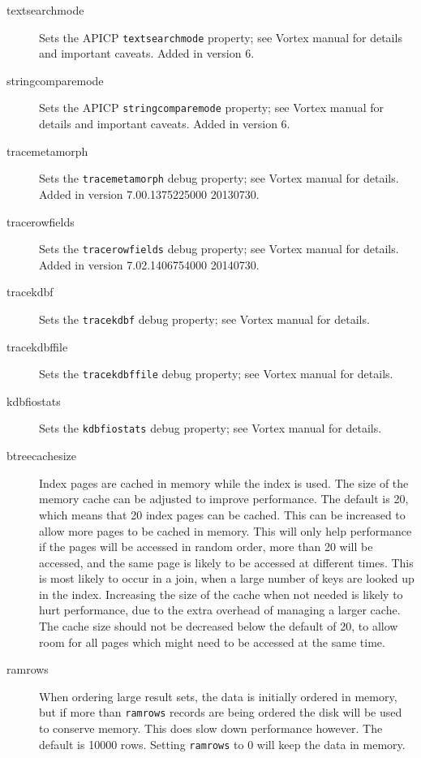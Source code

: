 \begin{description}
\item[textsearchmode]
  Sets the APICP \verb`textsearchmode` property; see Vortex manual
for details and important caveats.  Added in version 6.

\item[stringcomparemode]
  Sets the APICP \verb`stringcomparemode` property; see Vortex manual
for details and important caveats.  Added in version 6.

\item[tracemetamorph]
  Sets the \verb`tracemetamorph` debug property; see Vortex manual
for details.  Added in version 7.00.1375225000 20130730.

\item[tracerowfields]
  Sets the \verb`tracerowfields` debug property; see Vortex manual
for details.  Added in version 7.02.1406754000 20140730.

\item[tracekdbf]
  Sets the \verb`tracekdbf` debug property; see Vortex manual for details.

\item[tracekdbffile]
  Sets the \verb`tracekdbffile` debug property; see Vortex manual for details.

\item[kdbfiostats]
  Sets the \verb`kdbfiostats` debug property; see Vortex manual for details.

\item[btreecachesize]
  Index pages are cached in memory while the index is used.  The size
of the memory cache can be adjusted to improve performance.  The
default is 20, which means that 20 index pages can be cached.  This
can be increased to allow more pages to be cached in memory.  This
will only help performance if the pages will be accessed in random
order, more than 20 will be accessed, and the same page is likely to
be accessed at different times.  This is most likely to occur in a
join, when a large number of keys are looked up in the index.
Increasing the size of the cache when not needed is likely to hurt
performance, due to the extra overhead of managing a larger cache.
The cache size should not be decreased below the default of 20, to
allow room for all pages which might need to be accessed at the same
time.

\item[ramrows]
  When ordering large result sets, the data is initially ordered in
memory, but if more than \verb`ramrows` records are being ordered the
disk will be used to conserve memory.  This does slow down performance
however.  The default is 10000 rows.  Setting \verb`ramrows` to 0 will
keep the data in memory.


\end{description}
